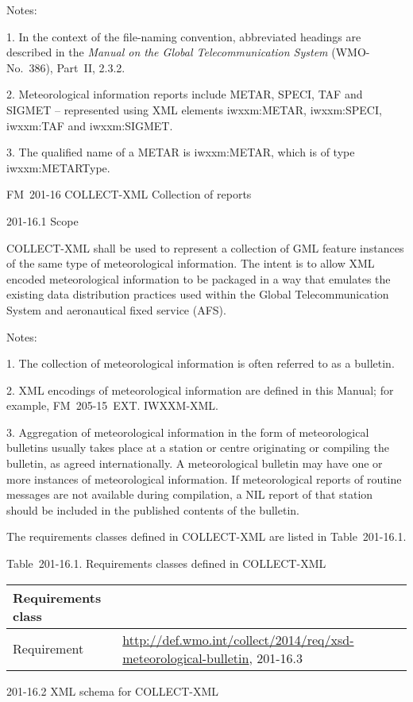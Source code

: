 Notes:

1. In the context of the file-naming convention, abbreviated headings are described in the \emph{Manual on the Global Telecommunication System} (WMO-No.~386), Part~II, 2.3.2.

2. Meteorological information reports include METAR, SPECI, TAF and SIGMET -- represented using XML elements iwxxm:METAR, iwxxm:SPECI, iwxxm:TAF and iwxxm:SIGMET.

3. The qualified name of a METAR is iwxxm:METAR, which is of type iwxxm:METARType.

FM~201-16 COLLECT-XML Collection of reports

201-16.1 Scope

COLLECT-XML shall be used to represent a collection of GML feature instances of the same type of meteorological information. The intent is to allow XML encoded meteorological information to be packaged in a way that emulates the existing data distribution practices used within the Global Telecommunication System and aeronautical fixed service (AFS).

Notes:

1. The collection of meteorological information is often referred to as a bulletin.

2. XML encodings of meteorological information are defined in this Manual; for example, FM~205-15~EXT. IWXXM‑XML.

3. Aggregation of meteorological information in the form of meteorological bulletins usually takes place at a station or centre originating or compiling the bulletin, as agreed internationally. A meteorological bulletin may have one or more instances of meteorological information. If meteorological reports of routine messages are not available during compilation, a NIL report of that station should be included in the published contents of the bulletin.

The requirements classes defined in COLLECT-XML are listed in Table~201-16.1.

Table~201-16.1. Requirements classes defined in COLLECT-XML

\begin{longtable}[]{@{}ll@{}}
\toprule
Requirements class &\tabularnewline
\midrule
\endhead
Requirement & \url{http://def.wmo.int/collect/2014/req/xsd-meteorological-bulletin}, 201-16.3\tabularnewline
\bottomrule
\end{longtable}

201-16.2 XML schema for COLLECT-XML

